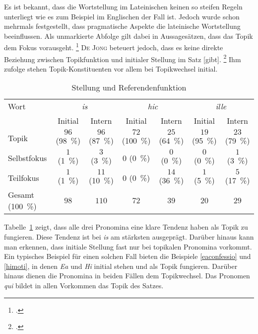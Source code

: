 \documentclass[12pt]{article}
\newcommand{\lat}[1]{\textit{#1}} %
\newcommand{\cntrl}[1]{#1} %
\begin{document}
Es ist bekannt, dass die Wortstellung im Lateinischen keinen so steifen Regeln unterliegt wie es zum Beispiel im Englischen der Fall ist. Jedoch wurde schon mehrmals
festgestellt, dass pragmatische Aspekte die lateinische Wortstellung beeinflussen. Als unmarkierte Abfolge gilt dabei in Aussagesätzen, dass das Topik dem Fokus vorausgeht.
\footcite[Hier S.\,153. Laut Panhuis steht das Verb dennoch nach dem Fokus, sofern es nicht selbst Topik ist.]{panhuis84}
\textsc{De Jong} beteuert jedoch, dass \glqq es keine direkte Beziehung zwischen Topikfunktion und initialer Stellung im Satz [gibt].\grqq
\footcite[``There is no straightforward relation between Topic function and first position in the clause.''][hier S.\,527]{dejong89}
Ihm zufolge stehen Topik-Konstituenten vor allem bei Topikwechsel initial.

\begin{table}[h]
  \centering
  \begin{tabular}{l*{6}{c}}
	\toprule
	Wort & \multicolumn{2}{c}{\lat{is}} & \multicolumn{2}{c}{\lat{hic}} & \multicolumn{2}{c}{\lat{ille}} \\
	{} & Initial & Intern & Initial & Intern & Initial & Intern \\
	\midrule
	Topik & $96$ (\SI{98}{\%}) & $96$ (\SI{87}{\%}) & $72$ (\SI{100}{\%}) & $25$ (\SI{64}{\%}) & $19$ (\SI{95}{\%}) & $23$ (\SI{79}{\%}) \\
	Selbstfokus & $1$ (\SI{1}{\%}) & $3$ (\SI{3}{\%}) & $0$ (\SI{0}{\%}) & $0$ (\SI{0}{\%}) & $0$ (\SI{0}{\%}) & $1$ (\SI{3}{\%}) \\
	Teilfokus & $1$ (\SI{1}{\%}) & $11$ (\SI{10}{\%}) & $0$ (\SI{0}{\%}) & $14$ (\SI{36}{\%}) & $1$ (\SI{5}{\%}) & $5$ (\SI{17}{\%}) \\
	Gesamt (\SI{100}{\%}) & $98$ & $110$ & $72$ & $39$ & $20$ & $29$ \\
	\bottomrule
  \end{tabular}
  \caption{Stellung und Referendenfunktion}
  \label{stellprag}
\end{table}

\noindent Tabelle~\ref{stellprag} zeigt, dass alle drei Pronomina eine klare Tendenz haben als Topik zu fungieren. Diese Tendenz ist bei \lat{is} am stärksten ausgeprägt. 
Darüber hinaus kann man erkennen, dass initiale Stellung fast nur bei topikalen Pronomina vorkommt. Ein typisches Beispiel für einen solchen Fall bieten die Beispiele \ref{eaconfessio} und \ref{himoti}, in denen \lat{Ea} und \lat{Hi} initial stehen und als Topik fungieren.
Darüber hinaus dienen die Pronomina in beiden Fällen dem Topikwechsel.
Das Pronomen \lat{qui} bildet in allen Vorkommen das Topik des Satzes.
\end{document}
